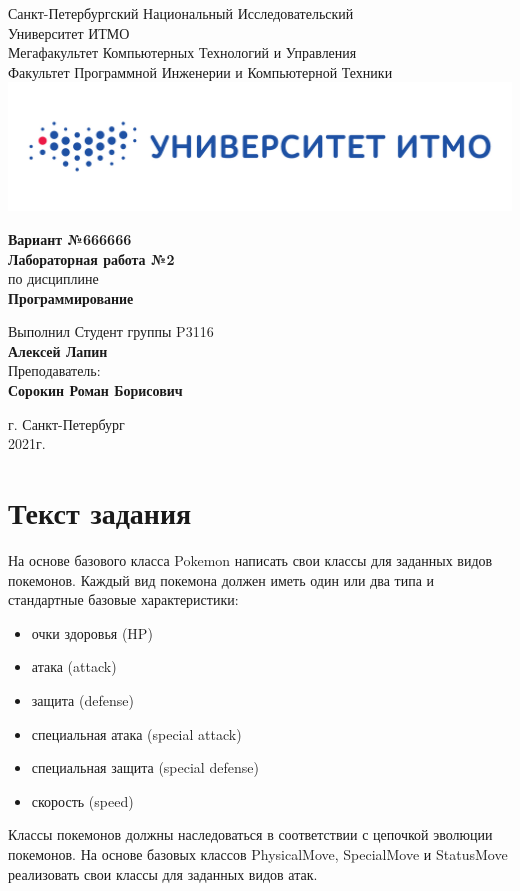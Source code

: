 \documentclass[12pt,onecolumn]{article}
\begin{document}
\setcounter{tocdepth}{4}
\begin{center}
    Санкт-Петербургский Национальный Исследовательский\\ 
    Университет ИТМО\\
    Мегафакультет Компьютерных Технологий и Управления\\
    Факультет Программной Инженерии и Компьютерной Техники \\
    \includegraphics[scale=0.3]{itm.jpg} %
\end{center}
\vspace{1cm}


\begin{center}
    \large \textbf{Вариант №666666}\\
    \textbf{Лабораторная работа №2}\\
    по дисциплине\\
    \textbf{Программирование}
\end{center}

\vspace{2cm}

\begin{flushright}
  Выполнил Студент  группы P3116\\
  \textbf{Алексей Лапин}\\
  Преподаватель: \\
  \textbf{Сорокин Роман Борисович}\\
\end{flushright}

\vspace{10cm}
\begin{center}
    г. Санкт-Петербург\\
    2021г.
\end{center}
\newpage
\tableofcontents
\newpage
\section{Текст задания}
На основе базового класса Pokemon написать свои классы для заданных видов покемонов. Каждый вид покемона должен иметь один или два типа и стандартные базовые характеристики:
\begin{itemize}
    \item очки здоровья (HP)
    \item атака (attack)
    \item защита (defense)
    \item специальная атака (special attack)
    \item специальная защита (special defense)
    \item скорость (speed)
\end{itemize}
Классы покемонов должны наследоваться в соответствии с цепочкой эволюции покемонов. На основе базовых классов PhysicalMove, SpecialMove и StatusMove реализовать свои классы для заданных видов атак.
\end{document}
